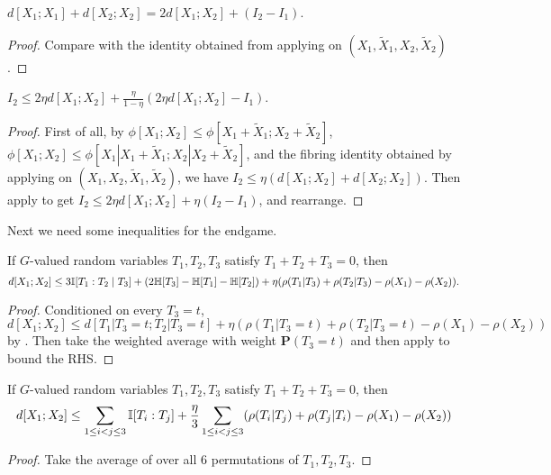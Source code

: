 \begin{lemma}\label{I1-I2-diff}
  $d[X_1;X_1]+d[X_2;X_2]= 2d[X_1;X_2]+(I_2-I_1)$.
\end{lemma}
\begin{proof}
Compare  with the identity obtained from applying  on $(X_1,\tilde X_1, X_2, \tilde X_2)$.
\end{proof}

\begin{lemma}\label{phi-second-estimate}
$I_2\le 2\eta d[X_1;X_2] + \frac{\eta}{1-\eta}(2\eta d[X_1;X_2]-I_1)$.
\end{lemma}
\begin{proof}
First of all, by $\phi[X_1;X_2]\le \phi[X_1+\tilde X_1;X_2+\tilde X_2]$, $\phi[X_1;X_2]\le \phi[X_1|X_1+\tilde X_1;X_2|X_2+\tilde X_2]$, and the fibring identity obtained by applying  on $(X_1,X_2,\tilde X_1,\tilde X_2)$,
we have $I_2\le \eta (d[X_1;X_2]+d[X_2;X_2])$. Then apply  to get $I_2\le 2\eta d[X_1;X_2] +\eta(I_2-I_1)$, and rearrange.
\end{proof}


Next we need some inequalities for the endgame. 
\begin{lemma}\label{rho-BSG-triplet}
  If $G$-valued random variables $T_1,T_2,T_3$ satisfy $T_1+T_2+T_3=0$, then 
  $$d[X_1;X_2]\le 3\mathbb{I}[T_1:T_2\mid T_3] + (2\mathbb{H}[T_3]-\mathbb{H}[T_1]-\mathbb{H}[T_2])+ \eta(\rho(T_1|T_3)+\rho(T_2|T_3)-\rho(X_1)-\rho(X_2)).$$
\end{lemma}
\begin{proof}
  Conditioned on every $T_3=t$, $d[X_1;X_2]\le d[T_1|T_3=t;T_2|T_3=t]+\eta(\rho(T_1|T_3=t)+\rho(T_2|T_3=t)-\rho(X_1)-\rho(X_2))$ by . Then take the weighted average with weight $\mathbf{P}(T_3=t)$ and then apply  to bound the RHS.
\end{proof}

\begin{lemma}\label{rho-BSG-triplet-symmetrized}
  If $G$-valued random variables $T_1,T_2,T_3$ satisfy $T_1+T_2+T_3=0$, then
  $$d[X_1;X_2] \leq  \sum_{1 \leq i<j \leq 3} \mathbb{I}[T_i:T_j] + \frac{\eta}{3}   \sum_{1 \leq i<j \leq 3} (\rho(T_i|T_j) + \rho(T_j|T_i) -\rho(X_1)-\rho(X_2))$$
\end{lemma}
\begin{proof}
  Take the average of  over all $6$ permutations of $T_1,T_2,T_3$.
\end{proof}


